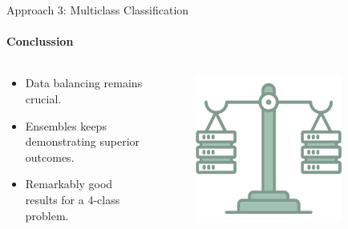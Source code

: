 \documentclass[9pt, pstricks, xcolor=dvipsnames]{beamer}
\begin{document}
\begin{frame}{Approach 3: Multiclass Classification}
\framesubtitle{Conclussion}
\begin{columns}
    \begin{column}{0.5\textwidth}
	\begin{itemize}
	    \item Data balancing remains crucial.
	    \item Ensembles keeps demonstrating superior outcomes.
	    \item Remarkably good results for a 4-class problem.
	\end{itemize}
    \end{column}
    \begin{column}{0.5\textwidth}
        \begin{figure}
            \centering
            \includegraphics[width=0.8\textwidth]{images/load-balancer.png}
        \end{figure}
    \end{column}

\end{columns}
\end{frame}
\end{document}
